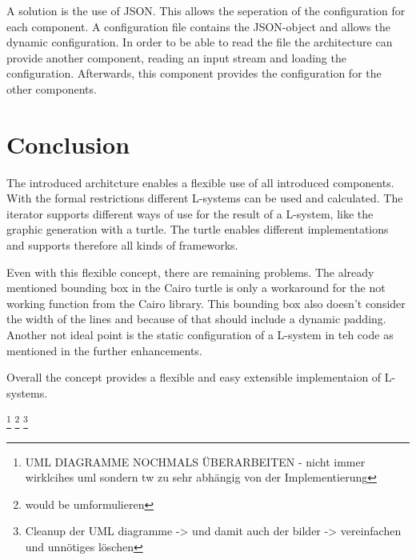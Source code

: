 \documentclass[english]{cpp-hmwk}
\begin{document}
A solution is the use of JSON. This allows the seperation of the configuration for each component. A configuration file contains the JSON-object and allows the dynamic configuration. In order to be able to read the file the architecture can provide another component, reading an input stream and loading the configuration. Afterwards, this component provides the configuration for the other components.

\section{Conclusion}
The introduced architcture enables a flexible use of all introduced components. With the formal restrictions different L-systems can be used and calculated. The iterator supports different ways of use for the result of a L-system, like the graphic generation with a turtle. The turtle enables different implementations and supports therefore all kinds of frameworks. 

\noindent Even with this flexible concept, there are remaining problems. The already mentioned bounding box in the Cairo turtle is only a workaround for the not working function from the Cairo library. This bounding box also doesn't consider the width of the lines and because of that should include a dynamic padding. Another not ideal point is the static configuration of a L-system in teh code as mentioned in the further enhancements. 

\noindent Overall the concept provides a flexible and easy extensible implementaion of L-systems.

\footnote{UML DIAGRAMME NOCHMALS ÜBERARBEITEN - nicht immer wirklcihes uml sondern tw zu sehr abhängig von der Implementierung}
\footnote{would be umformulieren}
\footnote{Cleanup der UML diagramme -> und damit auch der bilder -> vereinfachen und unnötiges löschen}

\pagebreak
\printbibliography
\end{document}
